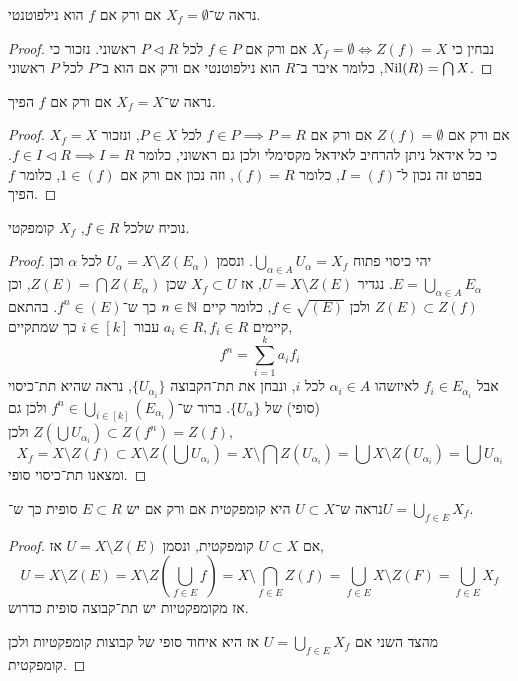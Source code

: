 \subquestion{}
נראה ש־$X_f = \emptyset$ אם ורק אם $f$ הוא נילפוטנטי.
\begin{proof}
	נבחין כי $X_f = \emptyset \iff Z(f) = X$ אם ורק אם $f \in P$ לכל $P \triangleleft R$ ראשוני.
	נזכור כי $\operatorname{Nil}(R) = \bigcap X$, כלומר איבר ב־$R$ הוא נילפוטנטי אם ורק אם הוא ב־$P$ לכל $P$ ראשוני.
\end{proof}

\subquestion{}
נראה ש־$X_f = X$ אם ורק אם $f$ הפיך.
\begin{proof}
	$X_f = X$ אם ורק אם $Z(f) = \emptyset$ אם ורק אם $f \in P \implies P = R$ לכל $P \in X$, ונזכור כי כל אידאל ניתן להרחיב לאידאל מקסימלי ולכן גם ראשוני, כלומר $f \in I \triangleleft R \implies I = R$.
	בפרט זה נכון ל־$I = (f)$, כלומר $(f) = R$, וזה נכון אם ורק אם $1 \in (f)$, כלומר $f$ הפיך.
\end{proof}

\subquestion{}
נוכיח שלכל $f \in R$, $X_f$ קומפקטי.
\begin{proof}
	יהי כיסוי פתוח $\bigcup_{\alpha \in A} U_{\alpha} = X_f$.
	ונסמן $U_{\alpha} = X \setminus Z(E_{\alpha})$ לכל $\alpha$ וכן $E = \bigcup_{\alpha \in A} E_{\alpha}$.
	נגדיר $U = X \setminus Z(E)$, אז $X_f \subset U$ שכן $Z(E) = \bigcap Z(E_{\alpha})$, וכן $Z(E) \subset Z(f)$ ולכן $f \in \sqrt{(E)}$, כלומר קיים $n \in \mathbb{N}$ כך ש־$f^n \in (E)$.
	בהתאם קיימים $a_i \in R, f_i \in R$ עבור $i \in [k]$ כך שמתקיים,
	\[
		f^n
		= \sum_{i = 1}^k a_i f_i
	\]
	אבל $f_i \in E_{\alpha_i}$ לאיזשהו $\alpha_i \in A$ לכל $i$, ונבחן את תת־הקבוצה $\{ U_{\alpha_i} \}$, נראה שהיא תת־כיסוי (סופי) של $\{ U_{\alpha} \}$.
	ברור ש־$f^n \in \bigcup_{i \in [k]} (E_{\alpha_i})$ ולכן גם $Z(\bigcup U_{\alpha_i}) \subset Z(f^n) = Z(f)$ ולכן,
	\[
		X_f
		= X \setminus Z(f)
		\subset X \setminus Z(\bigcup U_{\alpha_i})
		= X \setminus \bigcap Z(U_{\alpha_i})
		= \bigcup X \setminus Z(U_{\alpha_i})
		= \bigcup U_{\alpha_i}
	\]
	ומצאנו תת־כיסוי סופי.
\end{proof}

\subquestion{}
נראה ש־$U \subset X$ היא קומפקטית אם ורק אם יש $E \subset R$ סופית כך ש־$U = \bigcup_{f \in E} X_f$.
\begin{proof}
	אם $U \subset X$ קומפקטית, ונסמן $U = X \setminus Z(E)$ אז,
	\[
		U
		= X \setminus Z(E)
		= X \setminus Z(\bigcup_{f \in E} f)
		= X \setminus \bigcap_{f \in E} Z(f)
		= \bigcup_{f \in E} X \setminus Z(F)
		= \bigcup_{f \in E} X_f
	\]
	אז מקומפקטיות יש תת־קבוצה סופית כדרוש.

	מהצד השני אם $U = \bigcup_{f \in E} X_f$ אז היא איחוד סופי של קבוצות קומפקטיות ולכן קומפקטית.
\end{proof}


